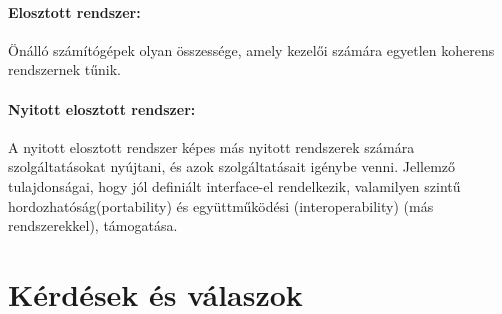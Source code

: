 \documentclass[twoside, a4paper, 12pt]{article}
\begin{document}
\paragraph{Elosztott rendszer:}
Önálló számítógépek olyan összessége, amely kezelői számára egyetlen
koherens rendszernek tűnik.
\paragraph{Nyitott elosztott rendszer:}
A nyitott elosztott rendszer képes más nyitott rendszerek számára
szolgáltatásokat nyújtani, és azok szolgáltatásait igénybe venni.
Jellemző tulajdonságai, hogy jól definiált interface-el rendelkezik,
valamilyen szintű hordozhatóság(portability) és
együttműködési (interoperability) (más
rendszerekkel), támogatása. 
\section{Kérdések és válaszok}
\end{document}
